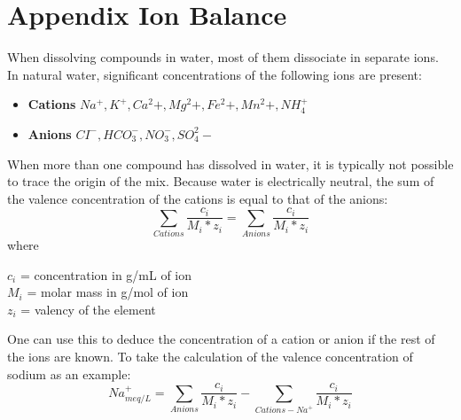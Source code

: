 
\section{Appendix Ion Balance}
When dissolving compounds in water, most of them dissociate in separate ions. In natural water, significant concentrations of the following ions are present:
\begin{itemize}
    \item \textbf{Cations} $Na^+, K^+, Ca^2+, Mg^2+, Fe^2+, Mn^2+, NH_4^+$
    \item \textbf{Anions} $CI^-, HCO_3^-, NO_3^-, SO_4^2-$
\end{itemize}
When more than one compound has dissolved in water, it is typically not possible to trace the origin of the mix. Because water is electrically neutral, the sum of the valence concentration of the cations is equal to that of the anions:
\[ \underset{Cations}\sum \frac{c_i}{M_i*z_i} =
\underset{Anions}\sum \frac{c_i}{M_i*z_i}\]
where
\begin{tabbing}
$c_i$ = concentration in g/mL of ion\\
$M_i$ = molar mass in g/mol of ion\\
$z_i$ = valency of the element
\end{tabbing}

One can use this to deduce the concentration of a cation or anion if the rest of the ions are known. To take the calculation of the valence concentration of sodium as an example:
\[Na^+_{meq/L} = \underset{Anions}\sum \frac{c_i}{M_i*z_i} - \underset{Cations-Na^+}\sum \frac{c_i}{M_i*z_i}\]


